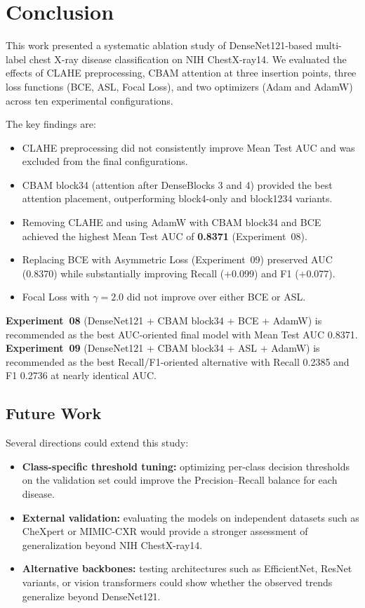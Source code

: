 \section{Conclusion}

This work presented a systematic ablation study of DenseNet121-based multi-label chest X-ray disease classification on NIH ChestX-ray14.
We evaluated the effects of CLAHE preprocessing, CBAM attention at three insertion points, three loss functions (BCE, ASL, Focal Loss), and two optimizers (Adam and AdamW) across ten experimental configurations.

The key findings are:
\begin{itemize}
  \item CLAHE preprocessing did not consistently improve Mean Test AUC and was excluded from the final configurations.
  \item CBAM block34 (attention after DenseBlocks 3 and 4) provided the best attention placement, outperforming block4-only and block1234 variants.
  \item Removing CLAHE and using AdamW with CBAM block34 and BCE achieved the highest Mean Test AUC of \textbf{0.8371} (Experiment~08).
  \item Replacing BCE with Asymmetric Loss (Experiment~09) preserved AUC (0.8370) while substantially improving Recall (+0.099) and F1 (+0.077).
  \item Focal Loss with $\gamma{=}2.0$ did not improve over either BCE or ASL.
\end{itemize}

\textbf{Experiment~08} (DenseNet121 + CBAM block34 + BCE + AdamW) is recommended as the best AUC-oriented final model with Mean Test AUC 0.8371.
\textbf{Experiment~09} (DenseNet121 + CBAM block34 + ASL + AdamW) is recommended as the best Recall/F1-oriented alternative with Recall 0.2385 and F1 0.2736 at nearly identical AUC.

\subsection*{Future Work}

Several directions could extend this study:
\begin{itemize}
    \item \textbf{Class-specific threshold tuning:} optimizing per-class decision thresholds on the validation set could improve the Precision--Recall balance for each disease.
    \item \textbf{External validation:} evaluating the models on independent datasets such as CheXpert or MIMIC-CXR would provide a stronger assessment of generalization beyond NIH ChestX-ray14.
    \item \textbf{Alternative backbones:} testing architectures such as EfficientNet, ResNet variants, or vision transformers could show whether the observed trends generalize beyond DenseNet121.
\end{itemize}
